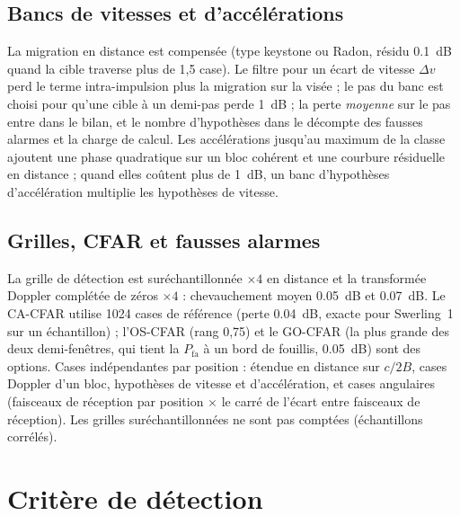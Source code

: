 \documentclass[11pt,a4paper]{article}
\newcommand{\Pfa}{P_{\mathrm{fa}}}
\begin{document}
\subsection{Bancs de vitesses et d'accélérations}
La migration en distance est compensée (type keystone ou Radon, résidu \SI{0.1}{dB} quand la cible traverse plus de
1,5 case). Le filtre pour un écart de vitesse $\Delta v$ perd le terme intra-impulsion plus la migration sur la visée ;
le pas du banc est choisi pour qu'une cible à un demi-pas perde \SI{1}{dB} ; la perte \emph{moyenne} sur le pas entre
dans le bilan, et le nombre d'hypothèses dans le décompte des fausses alarmes et la charge de calcul. Les accélérations
jusqu'au maximum de la classe ajoutent une phase quadratique sur un bloc cohérent et une courbure résiduelle en
distance ; quand elles coûtent plus de \SI{1}{dB}, un banc d'hypothèses d'accélération multiplie les hypothèses de
vitesse.

\subsection{Grilles, CFAR et fausses alarmes}
La grille de détection est suréchantillonnée $\times4$ en distance et la transformée Doppler complétée de zéros
$\times4$ : chevauchement moyen \SI{0.05}{dB} et \SI{0.07}{dB}. Le CA-CFAR utilise \num{1024} cases de référence (perte
\SI{0.04}{dB}, exacte pour Swerling~1 sur un échantillon) ; l'OS-CFAR (rang 0,75) et le GO-CFAR (la plus grande des deux
demi-fenêtres, qui tient la $\Pfa$ à un bord de fouillis, \SI{0.05}{dB}) sont des options. Cases indépendantes par
position : étendue en distance sur $c/2B$, cases Doppler d'un bloc, hypothèses de vitesse et d'accélération, et cases
angulaires (faisceaux de réception par position $\times$ le carré de l'écart entre faisceaux de réception). Les grilles
suréchantillonnées ne sont pas comptées (échantillons corrélés).

\section{Critère de détection}\label{sec:det}
\end{document}
